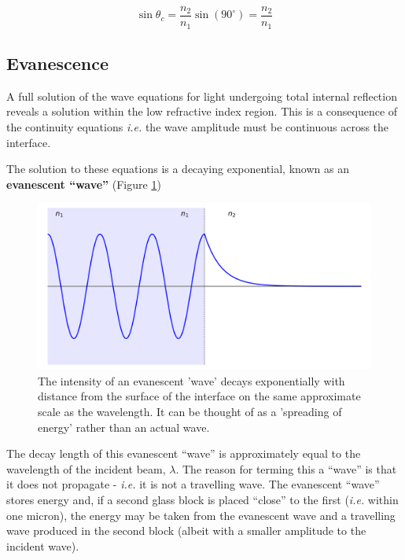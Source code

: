 \documentclass[
]{book}
\begin{document}
\begin{equation}
\sin \theta_c = \frac{n_2}{n_1}\sin(90^\circ) = \frac{n_2}{n_1}
\end{equation}

\hypertarget{sec:ch14-evanescence}{%
\subsection{Evanescence}\label{sec:ch14-evanescence}}

A full solution of the wave equations for light undergoing total internal reflection reveals a solution within the low refractive index region. This is a consequence of the continuity equations \emph{i.e.} the wave amplitude must be continuous across the interface.

The solution to these equations is a decaying exponential, known as an \textbf{evanescent ``wave''} (Figure \ref{fig:ch14-evanescentwave1})

\begin{figure}

{\centering \includegraphics[width=0.7\linewidth]{visualisations/ch14-evansecent1} 

}

\caption{The intensity of an evanescent 'wave' decays exponentially with distance from the surface of the interface on the same approximate scale as the wavelength. It can be thought of as a 'spreading of energy' rather than an actual wave.}\label{fig:ch14-evanescentwave1}
\end{figure}

The decay length of this evanescent ``wave'' is approximately equal to the wavelength of the incident beam, \(\lambda\). The reason for terming this a ``wave'' is that it does not propagate - \emph{i.e.} it is not a travelling wave. The evanescent ``wave'' stores energy and, if a second glass block is placed ``close'' to the first (\emph{i.e.} within one micron), the energy may be taken from the evanescent wave and a travelling wave produced in the second block (albeit with a smaller amplitude to the incident wave).
\end{document}
